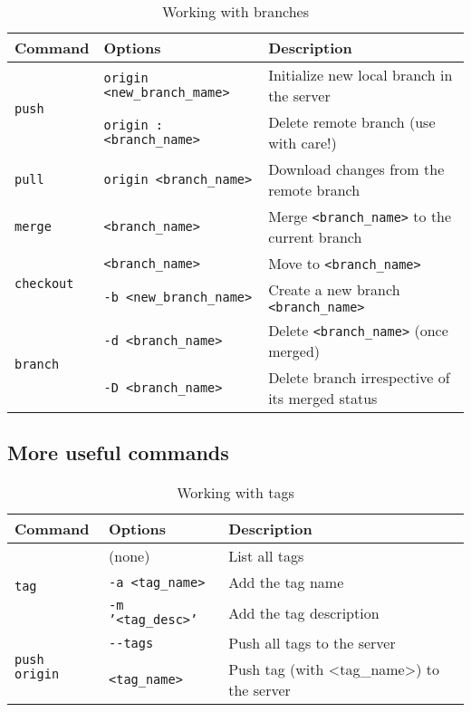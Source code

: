 \documentclass[a4paper,10pt]{article}
\begin{document}
\begin{table}
\caption{Working with branches}
\centering
\begin{tabular}{l l l}
\hline\hline
Command & Options & Description \\
\hline\hline
\multirow{2}{*}{\texttt{push}} & \texttt{origin <new\_branch\_mame>} & Initialize new local branch in the server \\
& \texttt{origin :<branch\_name>} & Delete remote branch (use with care!) \\ \hline
\multirow{1}{*}{\texttt{pull}} & \texttt{origin <branch\_name>} & Download changes from the remote branch  \\ \hline
\multirow{1}{*}{\texttt{merge}} & \texttt{<branch\_name>} & Merge \texttt{<branch\_name>} to the current branch \\ \hline
\multirow{2}{*}{\texttt{checkout}} & \texttt{<branch\_name>} & Move to \texttt{<branch\_name>}  \\
& \texttt{-b <new\_branch\_name>} & Create a new branch \texttt{<branch\_name>} \\ \hline
\multirow{2}{*}{\texttt{branch}} & \texttt{-d <branch\_name>} & Delete \texttt{<branch\_name>} (once merged) \\
& \texttt{-D <branch\_name>} & Delete branch irrespective of its merged status \\ \hline
\hline
\end{tabular}
\end{table}

\subsection{More useful commands}

\begin{table}
\caption{Working with tags}
\centering
\begin{tabular}{l l l}
\hline\hline
Command & Options & Description \\
\hline\hline
\multirow{3}{*}{\texttt{tag}} & (none) & List all tags \\
 & \texttt{-a <tag\_name>} & Add the tag name \\
 & \texttt{-m '<tag\_desc>'} & Add the tag description \\ \hline
\multirow{2}{*}{\texttt{push origin}} & \texttt{-{}-tags} & Push all tags to the server \\
 & \texttt{<tag\_name>} & Push tag (with <tag\_name>) to the server \\ \hline
\hline
\end{tabular}
\end{table}
\end{document}
